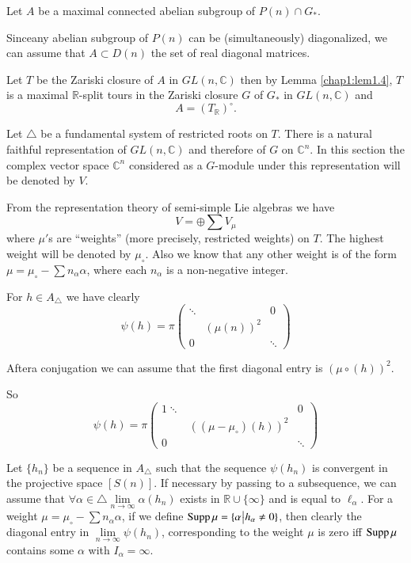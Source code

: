 Let $A$ be a maximal connected abelian subgroup of $P(n) \cap G_*$.

Since\pageoriginale any abelian subgroup of $P(n)$ can be (simultaneously)
diagonalized, we can assume that $A \subset D(n)$ the set of real
diagonal matrices.

Let $T$ be the Zariski closure of $A$ in $GL (n, \mathbb{C})$ then by
Lemma \ref{chap1:lem1.4}, $T$ is a maximal $\mathbb{R}$-split tours in
the Zariski closure $G$ of $G_*$ in $GL (n, \mathbb{C})$ and 
$$
A= (T_\mathbb{R})^\circ.
$$

Let $\triangle$ be a fundamental system of restricted roots on
$T$. There is a natural faithful representation of $GL (n,
\mathbb{C})$ and therefore of $G$ on $\mathbb{C}^n$. In this section
the complex vector space $\mathbb{C}^n$ considered as a $G$-module
under this representation will be denoted by $V$.

From the representation theory of semi-simple Lie algebras we have
$$
V = \oplus \sum V_\mu
$$
where $\mu'$s are ``weights'' (more precisely, restricted weights) on
$T$. The highest weight will be denoted by $\mu_\circ$. Also we know
that any other weight is of the form $\mu = \mu_\circ- \sum n_\alpha
\alpha$, where each $n_\alpha$ is a non-negative integer.

For $h \in A_\triangle$ we have clearly
\begin{equation*}
  \psi (h) = \pi
  \begin{pmatrix}
    \ddots & & 0\\
    & (\mu(n))^2 &\\
    0 & & \ddots
  \end{pmatrix}
\end{equation*}

After\pageoriginale a conjugation we can assume that the first diagonal entry is
$(\mu\circ(h))^2$.

So
\begin{equation*}
  \psi (h) = \pi
  \begin{pmatrix}
    1\ddots & & 0\\
    & ((\mu-\mu_\circ)(h))^2 &\\
    0 & & \ddots
  \end{pmatrix}
\end{equation*}

Let $\{ h_n\}$ be a sequence in $A_\triangle$ such that the sequence
$\psi(h_n)$ is convergent in the projective space $[S(n)]$. If
necessary by passing to a subsequence, we can assume that $\forall
\alpha \in \triangle \lim\limits_{n \to \infty} \alpha (h_n)$ exists
in $\mathbb{R} \cup \{ \infty\}$ and is equal to $\ell_\alpha$. For a
weight $\mu = \mu_\circ - \sum n_\alpha \alpha$, if we define $\operatorname{Supp}
\mu = \{ \alpha \big| h_\alpha \neq 0\}$, then clearly the diagonal
entry in $\lim\limits_{n \to \infty} \psi (h_n)$, corresponding to the
weight $\mu$ is zero iff $\operatorname{Supp} \mu$ contains some $\alpha$ with $I_\alpha =
\infty$.


